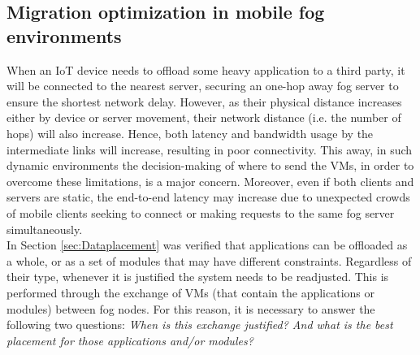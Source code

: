 \subsection{Migration optimization in mobile fog environments}
\label{sec:Migration}
When an IoT device needs to offload some heavy application to a third party, it will be connected to the nearest server, securing an one-hop away fog server to ensure the shortest network delay. However, as their physical distance increases either by device or server movement, their network distance (i.e. the number of hops) will also increase. Hence, both latency and bandwidth usage by the intermediate links will increase, resulting in poor connectivity. This away, in such dynamic environments the decision-making of where to send the VMs, in order to overcome these limitations, is a major concern. Moreover, even if both clients and servers are static, the end-to-end latency may increase due to unexpected crowds of mobile clients seeking to connect or making requests to the same fog server simultaneously.\\
\noindent\tab In Section \ref{sec:Dataplacement} was verified that applications can be offloaded as a whole, or as a set of modules that may have different constraints. Regardless of their type, whenever it is justified the system needs to be readjusted. This is performed through the exchange of VMs (that contain the applications or modules) between fog nodes. For this reason, it is necessary to answer the following two questions: \textit{When is this exchange justified? And what is the best placement for those applications and/or modules?}\\



